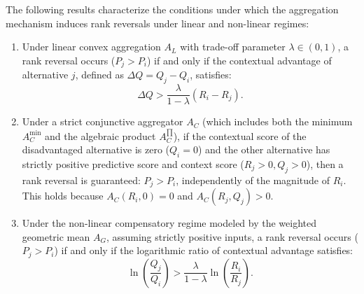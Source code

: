 \documentclass[mathematics,article,submit,moreauthors]{Definitions/mdpi}
\begin{document}
\begin{Proposition}
\label{prop:rank_reversal}
The following results characterize the conditions under which the aggregation mechanism induces rank reversals under linear and non-linear regimes:

\begin{enumerate}
\item Under linear convex aggregation $A_L$ with trade-off parameter $\lambda \in (0,1)$, a rank reversal occurs ($P_j > P_i$) if and only if the contextual advantage of alternative $j$, defined as $\Delta Q = Q_j - Q_i$, satisfies:
\begin{equation}
\Delta Q > \frac{\lambda}{1-\lambda}(R_i - R_j).
\end{equation}

\item Under a strict conjunctive aggregator $A_C$ (which includes both the minimum $A_C^{\min}$ and the algebraic product $A_C^{\prod}$), if the contextual score of the disadvantaged alternative is zero ($Q_i = 0$) and the other alternative has strictly positive predictive score and context score ($R_j > 0, Q_j > 0$), then a rank reversal is guaranteed: $P_j > P_i$, independently of the magnitude of $R_i$. This holds because $A_C(R_i, 0) = 0$ and $A_C(R_j, Q_j) > 0$.

\item Under the non-linear compensatory regime modeled by the weighted geometric mean $A_G$, assuming strictly positive inputs, a rank reversal occurs ($P_j > P_i$) if and only if the logarithmic ratio of contextual advantage satisfies:
\begin{equation}
\ln\left(\frac{Q_j}{Q_i}\right) > \frac{\lambda}{1-\lambda} \ln\left(\frac{R_i}{R_j}\right).
\end{equation}
\end{enumerate}
\end{Proposition}
\end{document}
